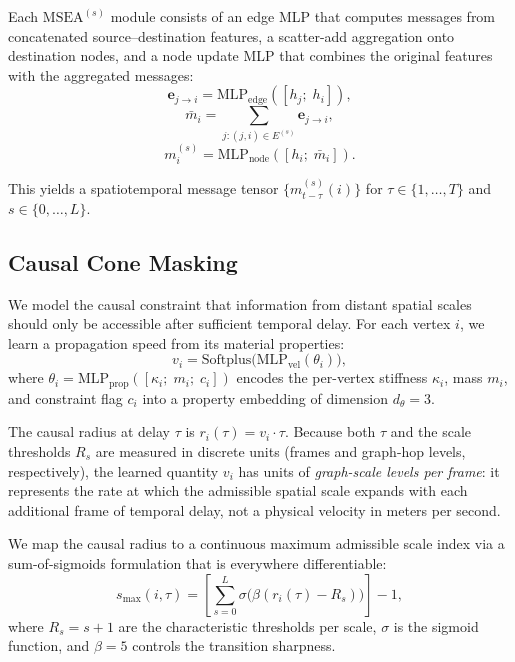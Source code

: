 \documentclass[10pt,twocolumn]{article}
\begin{document}
Each $\mathrm{MSEA}^{(s)}$ module consists of an edge MLP that computes messages from concatenated source--destination features, a scatter-add aggregation onto destination nodes, and a node update MLP that combines the original features with the aggregated messages:
\begin{equation}
    \mathbf{e}_{j \to i} = \mathrm{MLP}_{\mathrm{edge}}([h_j;\; h_i]),
\end{equation}
\begin{equation}
    \bar{m}_i = \sum_{j:(j,i)\in E^{(s)}} \mathbf{e}_{j \to i},
\end{equation}
\begin{equation}
    m^{(s)}_i = \mathrm{MLP}_{\mathrm{node}}([h_i;\; \bar{m}_i]).
\end{equation}

This yields a spatiotemporal message tensor $\{m^{(s)}_{t-\tau}(i)\}$ for $\tau \in \{1,\dots,T\}$ and $s \in \{0,\dots,L\}$.

\subsection{Causal Cone Masking}

We model the causal constraint that information from distant spatial scales should only be accessible after sufficient temporal delay. For each vertex $i$, we learn a propagation speed from its material properties:
\begin{equation}
    v_i = \mathrm{Softplus}\!\big(\mathrm{MLP}_{\mathrm{vel}}(\theta_i)\big),
\end{equation}
where $\theta_i = \mathrm{MLP}_{\mathrm{prop}}([\kappa_i;\; m_i;\; c_i])$ encodes the per-vertex stiffness $\kappa_i$, mass $m_i$, and constraint flag $c_i$ into a property embedding of dimension $d_\theta = 3$.

The causal radius at delay $\tau$ is $r_i(\tau) = v_i \cdot \tau$. Because both $\tau$ and the scale thresholds $R_s$ are measured in discrete units (frames and graph-hop levels, respectively), the learned quantity $v_i$ has units of \emph{graph-scale levels per frame}: it represents the rate at which the admissible spatial scale expands with each additional frame of temporal delay, not a physical velocity in meters per second.

We map the causal radius to a continuous maximum admissible scale index via a sum-of-sigmoids formulation that is everywhere differentiable:
\begin{equation}
    s_{\max}(i,\tau) = \left[\sum_{s=0}^{L} \sigma\!\big(\beta(r_i(\tau) - R_s)\big)\right] - 1,
\end{equation}
where $R_s = s+1$ are the characteristic thresholds per scale, $\sigma$ is the sigmoid function, and $\beta = 5$ controls the transition sharpness.
\end{document}
